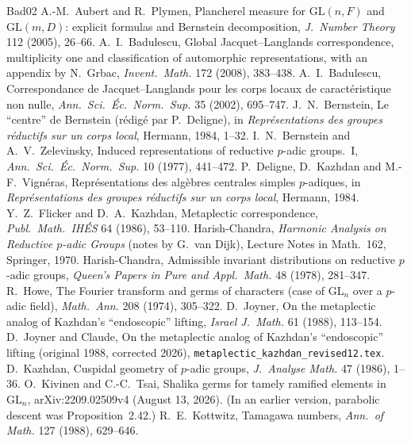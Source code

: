 \documentclass[12pt]{article}
\newcommand{\GL}{\mathrm{GL}}
\theoremstyle{plain}
\theoremstyle{definition}
\begin{document}
\begin{thebibliography}{Bad02}\small
{} A.-M.~Aubert and R.~Plymen, Plancherel measure for $\GL(n,F)$ and $\GL(m,D)$: explicit formulas and Bernstein decomposition, \emph{J.\ Number Theory} 112 (2005), 26--66.
 A.~I.~Badulescu, Global Jacquet--Langlands correspondence, multiplicity one and classification of automorphic representations, with an appendix by N.~Grbac, \emph{Invent.\ Math.} 172 (2008), 383--438.
 A.~I.~Badulescu, Correspondance de Jacquet--Langlands pour les corps locaux de caract\'eristique non nulle, \emph{Ann.\ Sci.\ \'Ec.\ Norm.\ Sup.} 35 (2002), 695--747.
 J.~N.~Bernstein, Le ``centre'' de Bernstein (r\'edig\'e par P.~Deligne), in \emph{Repr\'esentations des groupes r\'eductifs sur un corps local}, Hermann, 1984, 1--32.
 I.~N.~Bernstein and A.~V.~Zelevinsky, Induced representations of reductive $p$-adic groups.\ I, \emph{Ann.\ Sci.\ \'Ec.\ Norm.\ Sup.} 10 (1977), 441--472.
 P.~Deligne, D.~Kazhdan and M.-F.~Vign\'eras, Repr\'esentations des alg\`ebres centrales simples $p$-adiques, in \emph{Repr\'esentations des groupes r\'eductifs sur un corps local}, Hermann, 1984.
 Y.~Z.~Flicker and D.~A.~Kazhdan, Metaplectic correspondence, \emph{Publ.\ Math.\ IH\'ES} 64 (1986), 53--110.
 Harish-Chandra, \emph{Harmonic Analysis on Reductive $p$-adic Groups} (notes by G.~van Dijk), Lecture Notes in Math.\ 162, Springer, 1970.
 Harish-Chandra, Admissible invariant distributions on reductive $p$-adic groups, \emph{Queen's Papers in Pure and Appl.\ Math.} 48 (1978), 281--347.
 R.~Howe, The Fourier transform and germs of characters (case of $\GL_n$ over a $p$-adic field), \emph{Math.\ Ann.} 208 (1974), 305--322.
 D.~Joyner, On the metaplectic analog of Kazhdan's ``endoscopic'' lifting, \emph{Israel J.\ Math.} 61 (1988), 113--154.
 D.~Joyner and Claude, On the metaplectic analog of Kazhdan's ``endoscopic'' lifting (original 1988, corrected 2026), \texttt{metaplectic\_kazhdan\_revised12.tex}.
 D.~Kazhdan, Cuspidal geometry of $p$-adic groups, \emph{J.\ Analyse Math.} 47 (1986), 1--36.
 O.~Kivinen and C.-C.~Tsai, Shalika germs for tamely ramified elements in $\GL_n$, arXiv:2209.02509v4 (August 13, 2026). (In an earlier version, parabolic descent was Proposition~2.42.)
 R.~E.~Kottwitz, Tamagawa numbers, \emph{Ann.\ of Math.} 127 (1988), 629--646.

\end{thebibliography}
\end{document}
